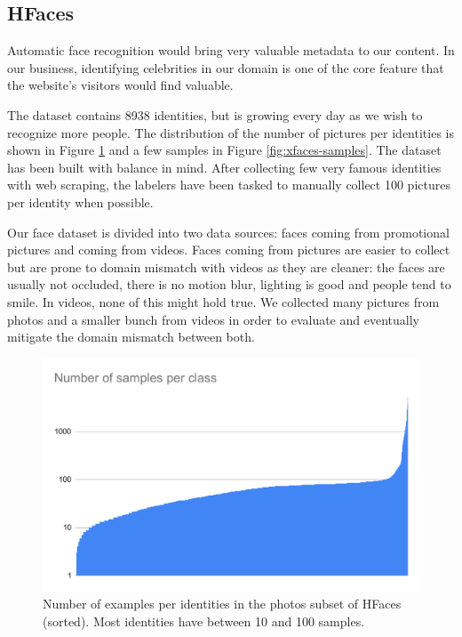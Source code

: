 \subsection{HFaces}

Automatic face recognition would bring very valuable metadata to our content. In our business, identifying celebrities in our domain is one of the core feature that the website's visitors would find valuable.

The dataset contains 8938 identities, but is growing every day as we wish to recognize more people. The distribution of the number of pictures per identities is shown in Figure \ref{fig:xfaces-num} and a few samples in Figure \ref{fig:xfaces-samples}. The dataset has been built with balance in mind. After collecting few very famous identities with web scraping, the labelers have been tasked to manually collect 100 pictures per identity when possible.

Our face dataset is divided into two data sources: faces coming from promotional pictures and coming from videos. Faces coming from pictures are easier to collect but are prone to domain mismatch with videos as they are cleaner: the faces are usually not occluded, there is no motion blur, lighting is good and people tend to smile. In videos, none of this might hold true. We collected many pictures from photos and a smaller bunch from videos in order to evaluate and eventually mitigate the domain mismatch between both.

\begin{figure}
    \centering
    \includegraphics[width=0.7\columnwidth]{20-files/xfaces-num.pdf}
    \caption{Number of examples per identities in the photos subset of HFaces (sorted). Most identities have between 10 and 100 samples.}
    \label{fig:xfaces-num}
\end{figure}

